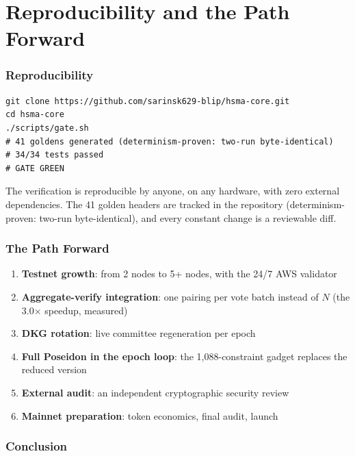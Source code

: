 \documentclass[11pt, a4paper]{article}
\theoremstyle{plain}
\theoremstyle{definition}
\theoremstyle{remark}
\begin{document}
\part{Reproducibility and the Path Forward}

\section{Reproducibility}
\label{sec:repro}

\begin{lstlisting}[style=bashstyle]
git clone https://github.com/sarinsk629-blip/hsma-core.git
cd hsma-core
./scripts/gate.sh
# 41 goldens generated (determinism-proven: two-run byte-identical)
# 34/34 tests passed
# GATE GREEN
\end{lstlisting}

The verification is reproducible by anyone, on any hardware, with
zero external dependencies. The 41 golden headers are tracked in the
repository (determinism-proven: two-run byte-identical), and every
constant change is a reviewable diff.

\section{The Path Forward}
\label{sec:path}

\begin{enumerate}
\item \textbf{Testnet growth}: from 2 nodes to 5+ nodes, with the
24/7 AWS validator
\item \textbf{Aggregate-verify integration}: one pairing per vote
batch instead of $N$ (the 3.0$\times$ speedup, measured)
\item \textbf{DKG rotation}: live committee regeneration per epoch
\item \textbf{Full Poseidon in the epoch loop}: the 1{,}088-constraint
gadget replaces the reduced version
\item \textbf{External audit}: an independent cryptographic security
review
\item \textbf{Mainnet preparation}: token economics, final audit,
launch
\end{enumerate}

\section{Conclusion}
\label{sec:conclusion}
\end{document}
